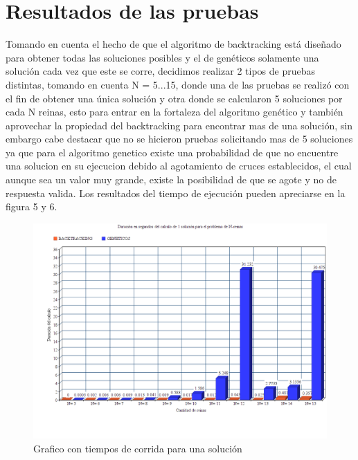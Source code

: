 \documentclass[12pt,a4paper]{article}
\begin{document}
\section{Resultados de las pruebas}

Tomando en cuenta el hecho de que el algoritmo de backtracking está diseñado para obtener todas las soluciones posibles y el de genéticos solamente una solución cada vez que este se corre, decidimos realizar 2 tipos de pruebas distintas, tomando en cuenta N = 5...15, donde una de las pruebas se realizó con el fin de obtener una única solución y otra donde se calcularon 5 soluciones por cada N reinas, esto para entrar en la fortaleza del algoritmo genético y también aprovechar la propiedad del backtracking para encontrar mas de una solución, sin embargo cabe destacar que no se hicieron pruebas solicitando mas de 5 soluciones ya que para el algoritmo genetico existe una probabilidad de que no encuentre una solucion en su ejecucion debido al agotamiento de cruces establecidos, el cual aunque sea un valor muy grande, existe la posibilidad de que se agote y no de respuesta valida. Los resultados del tiempo de ejecución pueden apreciarse en la figura 5 y 6.  \\

\begin{figure}[htp]
\centering
\graphicspath{ {imagenes/} }
\includegraphics[scale=0.60]{analisis1.png}
\caption{Grafico con tiempos de corrida para una solución}
\label{foto}
\end{figure}
\pagebreak
\end{document}
